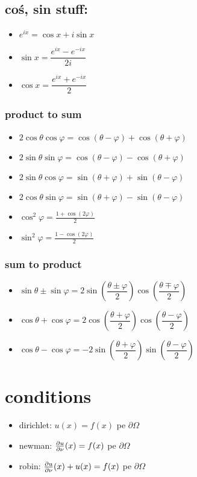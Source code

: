 \documentclass[11pt]{article}
\begin{document}
\subsection*{coś, sin stuff:}
\label{sec:org7281969}
\begin{itemize}
\item \(e^{ix} = \cos x + i \sin x\)
\item \(\sin x = \dfrac{e^{ix}-e^{-ix}}{2i}\)
\item \(\cos x = \dfrac{e^{ix}+e^{-ix}}{2}\)
\end{itemize}
\subsubsection*{product to sum}
\label{sec:orgaca7180}
\begin{itemize}
\item \(2\cos \theta \cos \varphi = {{\cos(\theta - \varphi) + \cos(\theta + \varphi)}}\)
\item \(2\sin \theta \sin \varphi = {{\cos(\theta - \varphi) - \cos(\theta + \varphi)} }\)
\item \(2\sin \theta \cos \varphi = {{\sin(\theta + \varphi) + \sin(\theta - \varphi)} }\)
\item \(2\cos \theta \sin \varphi = {{\sin(\theta + \varphi) - \sin(\theta - \varphi)} }\)
\item \(\cos^2 \varphi = \frac{1+\cos(2\varphi)}{2}\)
\item \(\sin^2 \varphi = \frac{1-\cos(2\varphi)}{2}\)
\end{itemize}

\subsubsection*{sum to product}
\label{sec:org84ef8d0}
\begin{itemize}
\item \(\sin \theta \pm \sin \varphi = 2 \sin\left( \dfrac{\theta \pm \varphi}{2} \right) \cos\left( \dfrac{\theta \mp \varphi}{2} \right)\)
\item \(\cos \theta + \cos \varphi = 2 \cos\left( \dfrac{\theta + \varphi} {2} \right) \cos\left( \dfrac{\theta - \varphi}{2} \right)\)
\item \(\cos \theta - \cos \varphi = -2\sin\left( \dfrac{\theta + \varphi}{2}\right) \sin\left(\dfrac{\theta - \varphi}{2}\right)\)
\end{itemize}


\section*{conditions}
\label{sec:org719911e}
\begin{itemize}
\item dirichlet: \(u(x) = f(x)\) pe \(\partial \Omega\)
\item newman: \(\frac{\partial u}{\partial \nu}(x) = f(x)\) pe \(\partial \Omega\)
\item robin: \(\frac{\partial u}{\partial \nu}(x) +u(x) = f(x)\) pe \(\partial \Omega\)
\end{itemize}
\end{document}
